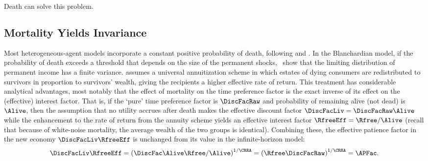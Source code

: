 \documentclass[\econtexRoot/BufferStockTheory]{subfiles}
\begin{document}

Death can solve this problem.


\hypertarget{Mortality}{}
\subsection{Mortality Yields Invariance}\label{sec:Mortality}

\hypertarget{Blanchard-Lives}{}
Most heterogeneous-agent models incorporate a constant positive probability of death, following \cite{blanchardFinite} and \cite{yaari1965uncertain}.
In the Blanchardian model, if the probability of death exceeds a threshold that depends on the size of the permanent shocks,~\cite{cstwMPC} show that the limiting distribution of permanent income has a finite variance.
\cite{blanchardFinite} assumes a universal annuitization scheme in which estates of dying consumers are redistributed to survivors in proportion to survivors' wealth, giving the recipients a higher effective rate of return.
This treatment has considerable analytical advantages, most notably that the effect of mortality on the time preference factor is the exact inverse of its effect on the (effective) interest factor.
That is, if the `pure' time preference factor is $\DiscFacRaw$ and probability of remaining alive (not dead) is $\Alive$, then the assumption that no utility accrues after death makes the effective discount factor $\DiscFacLiv=\DiscFacRaw\Alive$  while the enhancement to the rate of return from the annuity scheme yields an effective interest factor $\RfreeEff=\Rfree/\Alive$ (recall that because of white-noise mortality, the average wealth of the two groups is identical).
Combining these, the effective patience factor in the new economy $\DiscFacLiv \RfreeEff$ is unchanged from its value in the infinite-horizon model:%
\begin{equation}
  \DiscFacLiv \RfreeEff = {\left(\DiscFac \Alive \Rfree / \Alive\right)}^{1/\CRRA} = {\left(\Rfree \DiscFacRaw\right)}^{1/\CRRA} = \APFac.
\end{equation}
\end{document}

